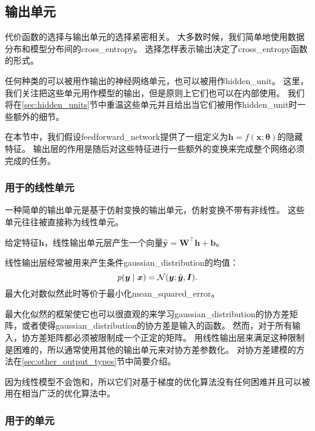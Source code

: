 \subsection{输出单元}
\label{sec:output_units}

代价函数的选择与输出单元的选择紧密相关。
大多数时候，我们简单地使用数据分布和模型分布间的\gls{cross_entropy}。
选择怎样表示输出决定了\gls{cross_entropy}函数的形式。

任何种类的可以被用作输出的神经网络单元，也可以被用作\gls{hidden_unit}。
这里，我们关注把这些单元用作模型的输出，但是原则上它们也可以在内部使用。
我们将在\ref{sec:hidden_units}节中重温这些单元并且给出当它们被用作\gls{hidden_unit}时一些额外的细节。

在本节中，我们假设\gls{feedforward_network}提供了一组定义为$\bm{h}=f(\bm{x};\bm{\theta})$的隐藏特征。
输出层的作用是随后对这些特征进行一些额外的变换来完成整个网络必须完成的任务。


\subsubsection{用于的线性单元}
\label{sec:linear_units_for_gaussian_output_distributions}

一种简单的输出单元是基于仿射变换的输出单元，仿射变换不带有非线性。
这些单元往往被直接称为线性单元。

给定特征$\bm{h}$，线性输出单元层产生一个向量$\hat{\bm{y}} = \bm{W}^\top \bm{h}+\bm{b}$。

线性输出层经常被用来产生条件\gls{gaussian_distribution}的均值：
\begin{equation}
p(\bm{y}\mid\bm{x}) = \mathcal{N}(\bm{y}; \hat{\bm{y}}, \bm{I} ).
\end{equation}
最大化对数似然此时等价于最小化\gls{mean_squared_error}。

最大化似然的框架使它也可以很直观的来学习\gls{gaussian_distribution}的协方差矩阵，或者使得\gls{gaussian_distribution}的协方差是输入的函数。
然而，对于所有输入，协方差矩阵都必须被限制成一个正定的矩阵。
用线性输出层来满足这种限制是困难的，所以通常使用其他的输出单元来对协方差参数化。
对协方差建模的方法在\ref{sec:other_output_types}节中简要介绍。

因为线性模型不会饱和，所以它们对基于梯度的优化算法没有任何困难并且可以被用在相当广泛的优化算法中。

\subsubsection{用于的单元}
\label{sec:sigmoid_units_for_bernoulli_output_distributions}

